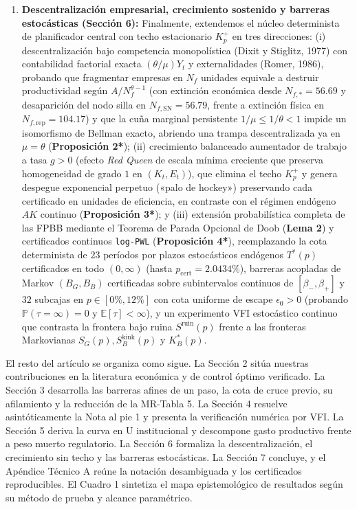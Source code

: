 \documentclass[11pt,letterpaper]{article}
\theoremstyle{plain}
\begin{document}
\begin{enumerate}
\item \textbf{Descentralización empresarial, crecimiento sostenido y barreras estocásticas (Sección 6):} Finalmente, extendemos el núcleo determinista de planificador central con techo estacionario $K_p^+$ en tres direcciones: (i) descentralización bajo competencia monopolística (Dixit y Stiglitz, 1977) con contabilidad factorial exacta $(\theta/\mu)Y_t$ y externalidades (Romer, 1986), probando que fragmentar empresas en $N_f$ unidades equivale a destruir productividad según $A/N_f^{\theta-1}$ (con extinción económica desde $N_{f,*}=56.69$ y desaparición del nodo silla en $N_{f,\mathrm{SN}}=56.79$, frente a extinción física en $N_{f,\mathrm{rep}}=104.17$) y que la cuña marginal persistente $1/\mu\le 1/\theta<1$ impide un isomorfismo de Bellman exacto, abriendo una trampa descentralizada ya en $\mu=\theta$ (\textbf{Proposición 2*}); (ii) crecimiento balanceado aumentador de trabajo a tasa $g>0$ (efecto \emph{Red Queen} de escala mínima creciente que preserva homogeneidad de grado $1$ en $(K_t,E_t)$), que elimina el techo $K_p^+$ y genera despegue exponencial perpetuo («palo de hockey») preservando cada certificado en unidades de eficiencia, en contraste con el régimen endógeno $AK$ continuo (\textbf{Proposición 3*}); y (iii) extensión probabilística completa de las FPBB mediante el Teorema de Parada Opcional de Doob (\textbf{Lema 2}) y certificados continuos \texttt{log-PWL} (\textbf{Proposición 4*}), reemplazando la cota determinista de $23$ períodos por plazos estocásticos endógenos $T^*(p)$ certificados en todo $(0,\infty)$ (hasta $p_{\mathrm{cert}}=2.0434\%$), barreras acopladas de Markov $(B_G,B_B)$ certificadas sobre subintervalos continuos de $[\beta_-,\beta_+]$ y $32$ subcajas en $p\in[0\%,12\%]$ con cota uniforme de escape $\epsilon_0>0$ (probando $\mathbb{P}(\tau=\infty)=0$ y $\mathbb{E}[\tau]<\infty$), y un experimento VFI estocástico continuo que contrasta la frontera bajo ruina $S^{\mathrm{ruin}}(p)$ frente a las fronteras Markovianas $S_G(p), S_B^{\mathrm{kink}}(p)$ y $K_B^*(p)$.
\end{enumerate}

El resto del artículo se organiza como sigue. La Sección 2 sitúa nuestras contribuciones en la literatura económica y de control óptimo verificado. La Sección 3 desarrolla las barreras afines de un paso, la cota de cruce previo, su afilamiento y la reducción de la MR-Tabla 5. La Sección 4 resuelve asintóticamente la Nota al pie 1 y presenta la verificación numérica por VFI. La Sección 5 deriva la curva en U institucional y descompone gasto productivo frente a peso muerto regulatorio. La Sección 6 formaliza la descentralización, el crecimiento sin techo y las barreras estocásticas. La Sección 7 concluye, y el Apéndice Técnico A reúne la notación desambiguada y los certificados reproducibles. El Cuadro 1 sintetiza el mapa epistemológico de resultados según su método de prueba y alcance paramétrico.
\end{document}
